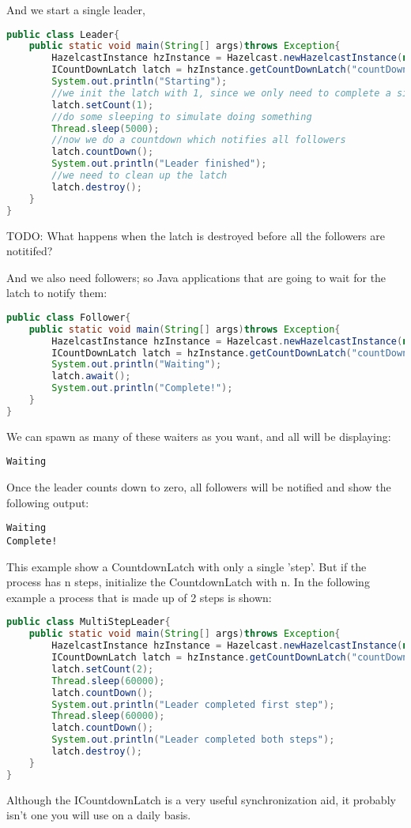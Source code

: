 \begin{enumerate}
And we start a single leader, 
\begin{lstlisting}[language=java]
public class Leader{
    public static void main(String[] args)throws Exception{
        HazelcastInstance hzInstance = Hazelcast.newHazelcastInstance(null);
        ICountDownLatch latch = hzInstance.getCountDownLatch("countDownLatch");      
        System.out.println("Starting");
        //we init the latch with 1, since we only need to complete a single step.
        latch.setCount(1); 
        //do some sleeping to simulate doing something    
        Thread.sleep(5000);
        //now we do a countdown which notifies all followers
        latch.countDown();
        System.out.println("Leader finished");
        //we need to clean up the latch
        latch.destroy();
    }
}
\end{lstlisting}

TODO: What happens when the latch is destroyed before all the followers are notitifed?

And we also need followers; so Java applications that are going to wait for the latch to notify them:
\begin{lstlisting}[language=java]
public class Follower{
    public static void main(String[] args)throws Exception{
        HazelcastInstance hzInstance = Hazelcast.newHazelcastInstance(null); 
        ICountDownLatch latch = hzInstance.getCountDownLatch("countDownLatch");
        System.out.println("Waiting");
        latch.await();
        System.out.println("Complete!");
    }
}
\end{lstlisting}
We can spawn as many of these waiters as you want, and all will be displaying:
\begin{lstlisting}
Waiting
\end{lstlisting}
Once the leader counts down to zero, all followers will be notified and show the following output:
\begin{lstlisting}
Waiting
Complete!
\end{lstlisting}
This example show a CountdownLatch with only a single 'step'. But if the process has n steps, initialize the CountdownLatch with n. In the following example a process that is made up of 2 steps is shown:
\begin{lstlisting}[language=java]
public class MultiStepLeader{
    public static void main(String[] args)throws Exception{
        HazelcastInstance hzInstance = Hazelcast.newHazelcastInstance(null);
        ICountDownLatch latch = hzInstance.getCountDownLatch("countDownLatch");
        latch.setCount(2);
        Thread.sleep(60000); 
        latch.countDown();
        System.out.println("Leader completed first step");      
        Thread.sleep(60000); 
        latch.countDown();
        System.out.println("Leader completed both steps");
        latch.destroy();
    }
}
\end{lstlisting}
Although the ICountdownLatch is a very useful synchronization aid, it probably isn't one you will use on a daily basis.


\end{enumerate}
